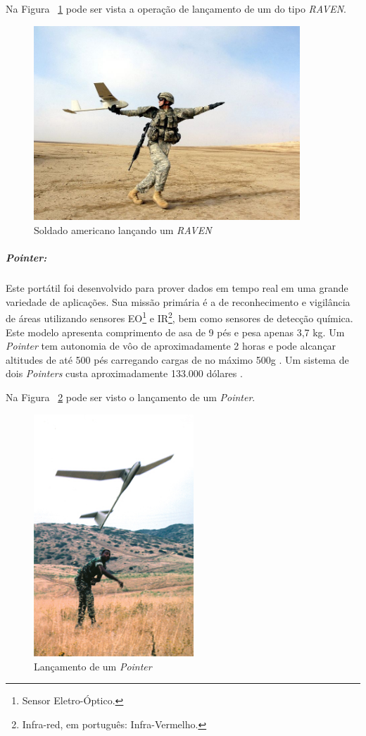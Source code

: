 Na Figura ~\ref{fig:raven} pode ser vista a operação de lançamento de um \vant do tipo \emph{RAVEN}.

\begin{figure}[h!]
\centering
\includegraphics[width=10cm]{pictures/launching_raven.jpg}
\caption{Soldado americano lançando um \emph{RAVEN} }
 \label{fig:raven}
\end{figure}




\subparagraph{ \emph{Pointer}:}
Este \vant  portátil foi desenvolvido para prover dados em tempo real em uma grande variedade de aplicações. Sua missão primária é a de reconhecimento e vigilância de áreas
utilizando sensores EO\footnote{Sensor Eletro-Óptico.} e IR\footnote{Infra-red, em português: Infra-Vermelho.}, bem como sensores de detecção química. Este modelo apresenta comprimento de asa de 9 pés e pesa apenas 3,7 kg. Um \emph{Pointer} tem autonomia de vôo de aproximadamente 2 horas e pode alcançar altitudes de até 500 pés carregando cargas de no máximo 500g \cite{uas_2009}. Um sistema de dois \emph{Pointers} custa aproximadamente 133.000 dólares \cite{Bone2003}. 

Na Figura ~\ref{fig:launching_pointer} pode ser visto o lançamento de um \emph{Pointer}. 

\begin{figure}[h!]
\centering
\includegraphics[width=6cm]{pictures/launching_pointer.jpg}
\caption{Lançamento de um \emph{Pointer} }
 \label{fig:launching_pointer}
\end{figure}


